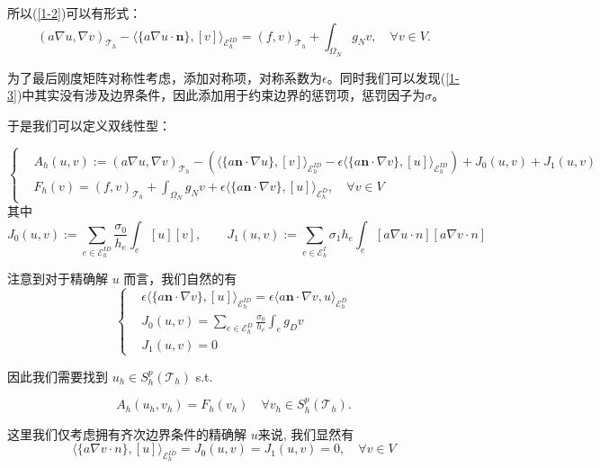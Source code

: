 所以(\ref{1-2})可以有形式：
\begin{equation}\label{1-3}
    (a \nabla u, \nabla v)_{\mathscr{T}_{h}}-\langle\{a \nabla u \cdot \textbf{n}\},[v]\rangle_{\mathcal{E}_{h}^{I D}}=(f, v)_{\mathscr{T}_h}+\int_{\Omega_N}g_Nv, \quad \forall v \in V .
\end{equation}

为了最后刚度矩阵对称性考虑，添加对称项，对称系数为$\epsilon$。同时我们可以发现(\ref{1-3})中其实没有涉及边界条件，因此添加用于约束边界的惩罚项，惩罚因子为$\sigma$。

于是我们可以定义双线性型：

$$\left\{\begin{aligned}
    &A_{h}(u, v):=  (a \nabla u, \nabla v)_{\mathscr{T}_{h}}-\left(\langle\{a\textbf{n}\cdot \nabla u \},[v]\rangle_{\mathcal{E}_{h}^{I D}}-\epsilon\langle\{a \textbf{n}\cdot\nabla v \}, [u]\rangle_{\mathcal{E}_{h}^{I D}}\right)+J_{0}(u, v)+J_{1}(u, v)\\
    &F_h(v)=(f, v)_{\mathscr{T}_h}+\int_{\Omega_N}g_Nv+\epsilon\langle\{a \textbf{n}\cdot\nabla v \}, [u]\rangle_{\mathcal{E}_{h}^{D}}, \quad \forall v \in V
\end{aligned}\right.$$
其中 $$J_{0}(u, v):= \sum_{e \in \mathcal{E}_{h}^{I D}} \frac{\sigma_{0}}{h_{e}} \int_{e}[u][v],\qquad
J_{1}(u, v):= \sum_{e \in \mathcal{E}_{h}^{I}} \sigma_{1} h_{e} \int_{e}[a \nabla u \cdot n][a \nabla v \cdot n]$$

注意到对于精确解 $u$ 而言，我们自然的有 
$$\left\{\begin{aligned}
    &\epsilon\langle\{a \textbf{n}\cdot\nabla v \}, [u]\rangle_{\mathcal{E}_{h}^{I D}}=\epsilon\langle a \textbf{n}\cdot\nabla v, u\rangle_{\mathcal{E}_{h}^{D}}\\
    &J_{0}(u, v)= \sum_{e \in \mathcal{E}_{h}^{D}} \frac{\sigma_{0}}{h_{e}} \int_{e}g_Dv\\
    &J_1(u,v) = 0
\end{aligned}\right.$$

因此我们需要找到 $ u_{h} \in S_h^p(\mathscr{T}_h)$ s.t.

\begin{equation}\label{dgpossion}
    A_{h}\left(u_{h}, v_{h}\right)=F_h(v_h) \quad \forall v_{h} \in S_h^p(\mathscr{T}_h) .
\end{equation}

这里我们仅考虑拥有齐次边界条件的精确解 $u$来说, 我们显然有
$$\langle\{a \nabla v \cdot n\},[u]\rangle_{\mathcal{E}_{h}^{I D}}=J_{0}(u, v)=J_{1}(u, v)=0, \quad \forall v \in V$$


